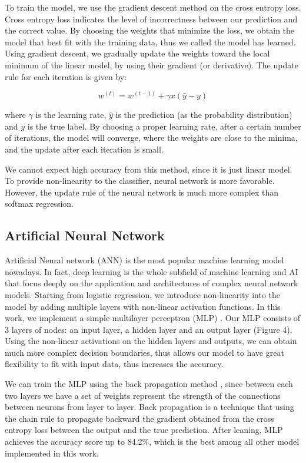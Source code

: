 \documentclass[12,]{article}
\begin{document}
To train the model, we use the gradient descent method on the cross
entropy loss. Cross entropy loss indicates the level of incorrectness
between our prediction and the correct value. By choosing the weights
that minimize the loss, we obtain the model that best fit with the
training data, thus we called the model has learned. Using gradient
descent, we gradually update the weights toward the local minimum of the
linear model, by using their gradient (or derivative). The update rule
for each iteration is given by:

\[
w^{(t)} = w^{(t-1)} + \gamma x (\hat{y} - y)
\]

where \(\gamma\) is the learning rate, \(\hat{y}\) is the prediction (as
the probability distribution) and \(y\) is the true label. By choosing a
proper learning rate, after a certain number of iterations, the model
will converge, where the weights are close to the minima, and the update
after each iteration is small.

We cannot expect high accuracy from this method, since it is just linear
model. To provide non-linearity to the classifier, neural network is
more favorable. However, the update rule of the neural network is much
more complex than softmax regression.

\hypertarget{artificial-neural-network}{%
\subsection{Artificial Neural Network}\label{artificial-neural-network}}

Artificial Neural network (ANN) is the most popular machine learning
model nowadays. In fact, deep learning is the whole subfield of machine
learning and AI that focus deeply on the application and architectures
of complex neural network models. Starting from logistic regression, we
introduce non-linearity into the model by adding multiple layers with
non-linear activation functions. In this work, we implement a simple
multilayer perceptron (MLP) \cite{mlp}. Our MLP consists of 3 layers of
nodes: an input layer, a hidden layer and an output layer (Figure 4).
Using the non-linear activations on the hidden layers and outputs, we
can obtain much more complex decision boundaries, thus allows our model
to have great flexibility to fit with input data, thus increases the
accuracy.

We can train the MLP using the back propagation method
\cite{rumelhart:errorpropnonote}, since between each two layers we have
a set of weights represent the strength of the connections between
neurons from layer to layer. Back propagation is a technique that using
the chain rule \cite{chain-rule} to propagate backward the gradient
obtained from the cross entropy loss between the output and the true
prediction. After leaning, MLP achieves the accuracy score up to 84.2\%,
which is the best among all other model implemented in this work.
\end{document}
